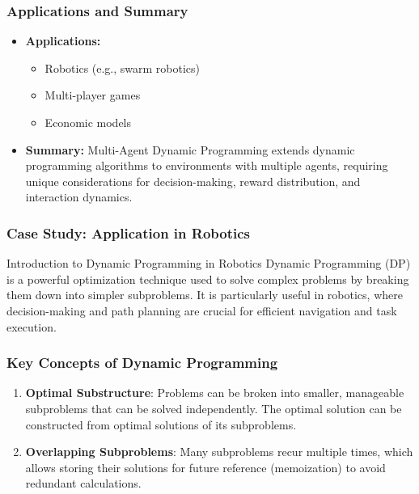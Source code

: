 \documentclass[aspectratio=169]{beamer}
\begin{document}
\begin{frame}[fragile]
    \frametitle{Applications and Summary}
    \begin{itemize}
        \item \textbf{Applications:}
        \begin{itemize}
            \item Robotics (e.g., swarm robotics)
            \item Multi-player games
            \item Economic models
        \end{itemize}
        \item \textbf{Summary:} Multi-Agent Dynamic Programming extends dynamic programming algorithms to environments with multiple agents, requiring unique considerations for decision-making, reward distribution, and interaction dynamics.
    \end{itemize}
\end{frame}

\begin{frame}[fragile]
  \frametitle{Case Study: Application in Robotics}
  \begin{block}{Introduction to Dynamic Programming in Robotics}
    Dynamic Programming (DP) is a powerful optimization technique used to solve complex problems by breaking them down into simpler subproblems. It is particularly useful in robotics, where decision-making and path planning are crucial for efficient navigation and task execution.
  \end{block}
\end{frame}

\begin{frame}[fragile]
  \frametitle{Key Concepts of Dynamic Programming}
  \begin{enumerate}
    \item \textbf{Optimal Substructure}: Problems can be broken into smaller, manageable subproblems that can be solved independently. The optimal solution can be constructed from optimal solutions of its subproblems.
    \item \textbf{Overlapping Subproblems}: Many subproblems recur multiple times, which allows storing their solutions for future reference (memoization) to avoid redundant calculations.
  \end{enumerate}
\end{frame}
\end{document}
